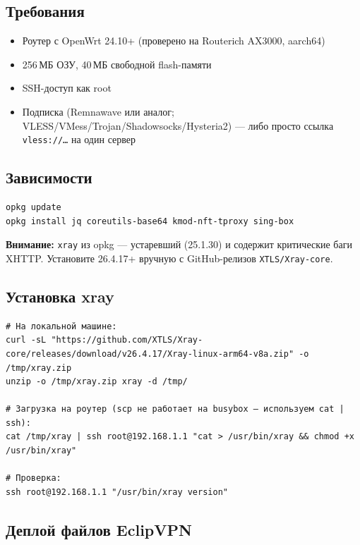 \documentclass[11pt,a4paper]{article}
\begin{document}
\subsection{Требования}

\begin{itemize}
\item Роутер с OpenWrt 24.10+ (проверено на Routerich AX3000, aarch64)
\item 256\,МБ ОЗУ, 40\,МБ свободной flash-памяти
\item SSH-доступ как root
\item Подписка (Remnawave или аналог; VLESS/VMess/Trojan/Shadowsocks/Hysteria2) --- либо просто ссылка \texttt{vless://…} на один сервер
\end{itemize}

\subsection{Зависимости}

\begin{lstlisting}
opkg update
opkg install jq coreutils-base64 kmod-nft-tproxy sing-box
\end{lstlisting}

\begin{notebox}
\textbf{Внимание:} \texttt{xray} из opkg — устаревший (25.1.30) и содержит критические баги XHTTP. Установите 26.4.17+ вручную с GitHub-релизов \texttt{XTLS/Xray-core}.
\end{notebox}

\subsection{Установка xray}

\begin{lstlisting}
# На локальной машине:
curl -sL "https://github.com/XTLS/Xray-core/releases/download/v26.4.17/Xray-linux-arm64-v8a.zip" -o /tmp/xray.zip
unzip -o /tmp/xray.zip xray -d /tmp/

# Загрузка на роутер (scp не работает на busybox — используем cat | ssh):
cat /tmp/xray | ssh root@192.168.1.1 "cat > /usr/bin/xray && chmod +x /usr/bin/xray"

# Проверка:
ssh root@192.168.1.1 "/usr/bin/xray version"
\end{lstlisting}

\subsection{Деплой файлов EclipVPN}
\end{document}
